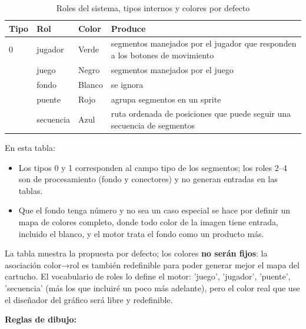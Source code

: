 \begin{table}[htbp]
	\centering
	\begin{tabular}{lllp{6.5cm}}
		\toprule
		\textbf{Tipo} & \textbf{Rol} & \textbf{Color} & \textbf{Produce} \\ 
		\midrule
		0 & jugador & Verde & segmentos manejados por el jugador que responden a los botones de movimiento \\ \addlinespace
		1 & juego & Negro & segmentos manejados por el juego \\ \addlinespace
		2 & fondo & Blanco & se ignora \\ \addlinespace
		3 & puente & Rojo & agrupa segmentos en un sprite \\ \addlinespace
		4 & secuencia & Azul &  ruta ordenada de posiciones que puede seguir una secuencia de segmentos \\ 
		\bottomrule
	\end{tabular}
	\caption{Roles del sistema, tipos internos y colores por defecto}
	\label{tab:coloresRoles}
\end{table}

En esta tabla:
\begin{itemize}
	\item Los tipos 0 y 1 corresponden al campo tipo de los segmentos; los roles 2–4 son de procesamiento (fondo y conectores) y no generan entradas en las tablas.
	\item Que el fondo tenga número y no sea un caso especial se hace por definir un mapa de colores completo, donde todo color de la imagen tiene entrada, incluido el blanco, y el motor trata el fondo como un producto más.
\end{itemize}
La tabla muestra la propuesta por defecto; los colores \textbf{no serán fijos}: la asociación color→rol es también redefinible para poder generar mejor el mapa del cartucho. El vocabulario de roles lo define el motor: 'juego', 'jugador', 'puente', 'secuencia' (más los que incluiré un poco más adelante), pero el color real que use el diseñador del gráfico será libre y redefinible.

\textbf{Reglas de dibujo:}

